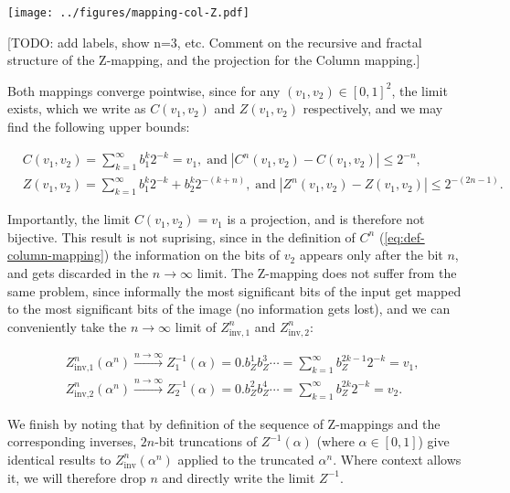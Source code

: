 \documentclass[10pt,letterpaper]{article}
\begin{document}
\texttt{[image: ../figures/mapping-col-Z.pdf]}

[TODO: add labels, show n=3, etc. Comment on the recursive and fractal structure of the Z-mapping, and the projection for the Column mapping.]
\endif

Both mappings converge pointwise, since for any $(v_1,v_2) \in [0,1]^2$, the limit exists, which we write as $C(v_1,v_2)$ and $Z(v_1,v_2)$ respectively, and we may find the following upper bounds:

\begin{equation} \begin{aligned}
& C(v_1,v_2) = \sum_{k=1}^\infty b_1^k 2^{-k} = v_1, \;\text{and}\; |C^n(v_1,v_2)-C(v_1,v_2)| \leq 2^{-n},\\
& Z(v_1,v_2) = \sum_{k=1}^\infty b_1^k 2^{-k} + b_2^k 2^{-(k+n)}, \;\text{and}\; |Z^n(v_1,v_2)-Z(v_1,v_2)|\leq 2^{-(2n-1)}.
\end{aligned} \end{equation}

Importantly, the limit $C(v_1,v_2)=v_1$ is a projection, and is therefore not bijective. This result is not suprising, since in the definition of $C^n$ (\autoref{eq:def-column-mapping}) the information on the bits of $v_2$ appears only after the bit $n$, and gets discarded in the $n \to \infty$ limit. The Z-mapping does not suffer from the same problem, since informally the most significant bits of the input get mapped to the most significant bits of the image (no information gets lost), and we can conveniently take the $n \to \infty$ limit of $Z_{\textrm{inv},1}^n$ and $Z_{\textrm{inv},2}^n$:

\begin{equation} \begin{aligned}
&Z_{\textrm{inv,1}}^n(\alpha^n) \xrightarrow{n \to \infty} Z^{-1}_1(\alpha) = 0.b_Z^1 b_Z^3 \cdots = \sum_{k=1}^\infty b_Z^{2k-1} 2^{-k} = v_1,\\
&Z_{\textrm{inv,2}}^n(\alpha^n) \xrightarrow{n \to \infty} Z^{-1}_2(\alpha) = 0.b_Z^2 b_Z^4 \cdots = \sum_{k=1}^\infty b_Z^{2k} 2^{-k} = v_2.
\end{aligned} \end{equation}

We finish by noting that by definition of the sequence of Z-mappings and the corresponding inverses, $2n$-bit truncations of $Z^{-1}(\alpha)$ (where $\alpha \in [0,1]$) give identical results to $Z^n_\textrm{inv}(\alpha^n)$ applied to the truncated $\alpha^n$. Where context allows it, we will therefore drop $n$ and directly write the limit $Z^{-1}$.
\end{document}
